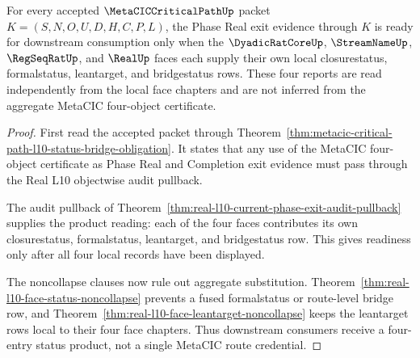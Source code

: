\begin{theorem}
\label{thm:metacic-critical-path-phase-real-status-product-readiness}
For every accepted $\MetaCICCriticalPathUp$ packet $K=(S,N,O,U,D,H,C,P,L)$, the Phase Real exit evidence through $K$ is ready for downstream consumption only when the $\DyadicRatCoreUp$, $\StreamNameUp$, $\RegSeqRatUp$, and $\RealUp$ faces each supply their own local closurestatus, formalstatus, leantarget, and bridgestatus rows. These four reports are read independently from the local face chapters and are not inferred from the aggregate MetaCIC four-object certificate.
\end{theorem}
\begin{proof}
First read the accepted packet through Theorem~\ref{thm:metacic-critical-path-l10-status-bridge-obligation}. It states that any use of the MetaCIC four-object certificate as Phase Real and Completion exit evidence must pass through the Real L10 objectwise audit pullback.

The audit pullback of Theorem~\ref{thm:real-l10-current-phase-exit-audit-pullback} supplies the product reading: each of the four faces contributes its own closurestatus, formalstatus, leantarget, and bridgestatus row. This gives readiness only after all four local records have been displayed.

The noncollapse clauses now rule out aggregate substitution. Theorem~\ref{thm:real-l10-face-status-noncollapse} prevents a fused formalstatus or route-level bridge row, and Theorem~\ref{thm:real-l10-face-leantarget-noncollapse} keeps the leantarget rows local to their four face chapters. Thus downstream consumers receive a four-entry status product, not a single MetaCIC route credential.
\end{proof}

